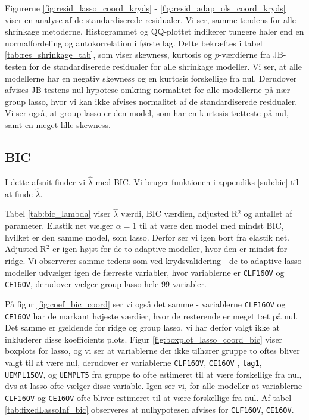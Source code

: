 Figurerne \ref{fig:resid_lasso_coord_kryds} - \ref{fig:resid_adap_ols_coord_kryds} viser en analyse af de standardiserede residualer. 
Vi ser, samme tendens for alle shrinkage metoderne. Histogrammet og QQ-plottet indikerer tungere haler end en normalfordeling og autokorrelation i første lag.
Dette bekræftes i tabel  \ref{tab:res_shrinkage_tab}, som viser skewness, kurtosis og $p$-værdierne fra JB-testen for de standardiserede residualer for alle shrinkage modeller. 
Vi ser, at alle modellerne har en negativ skewness og en kurtosis forskellige fra nul. 
Derudover afvises JB testens nul hypotese omkring normalitet for alle modellerne på nær group lasso, hvor vi kan ikke afvises normalitet af de standardiserede residualer. 
Vi ser også, at group lasso er den model, som har en kurtosis tætteste på nul, samt en meget lille skewness. 

\clearpage

\subsection{BIC}
I dette afsnit finder vi $\widehat{\lambda}$ med BIC. 
Vi bruger funktionen i appendiks \ref{sub:bic} til at finde $\widehat{\lambda}$. 

Tabel \ref{tab:bic_lambda} viser $\widehat{\lambda}$ værdi, BIC værdien, adjusted R$^2$ og antallet af parameter. 
Elastik net vælger $\alpha =1$ til at være den model med mindst BIC, hvilket er den samme model, som lasso. 
Derfor ser vi igen bort fra elastik net. 
Adjusted R$^2$ er igen højst for de to adaptive modeller, hvor den er mindst for ridge. 
Vi observerer samme tedens som ved krydsvalidering - de to adaptive lasso modeller udvælger igen de færreste variabler, hvor variablerne er  \texttt{CLF16OV} og \texttt{CE16OV}, derudover vælger group lasso hele 99 variabler. 



På figur \ref{fig:coef_bic_coord} ser vi også det samme - variablerne \texttt{CLF16OV} og \texttt{CE16OV} har de markant højeste værdier, hvor de resterende er meget tæt på nul. 
Det samme er gældende for ridge og group lasso, vi har derfor valgt ikke at inkluderer disse koefficients plots. 
Figur \ref{fig:boxplot_lasso_coord_bic} viser boxplots for lasso, og vi ser at variablerne der ikke tilhører gruppe to oftes bliver valgt til at være nul, derudover er variablerne  \texttt{CLF16OV},  \texttt{CE16OV} , \texttt{lag1}, \texttt{UEMPL15OV}, og \texttt{UEMPLT5} fra gruppe to ofte estimeret til at være forskellige fra nul, dvs at lasso ofte vælger disse variable. 
Igen ser vi, for alle modeller at variablerne \texttt{CLF16OV} og \texttt{CE16OV} ofte bliver estimeret til at være forskellige fra nul. 
Af tabel \ref{tab:fixedLassoInf_bic} observeres at nulhypotesen afvises for \texttt{CLF16OV}, \texttt{CE16OV}. 

